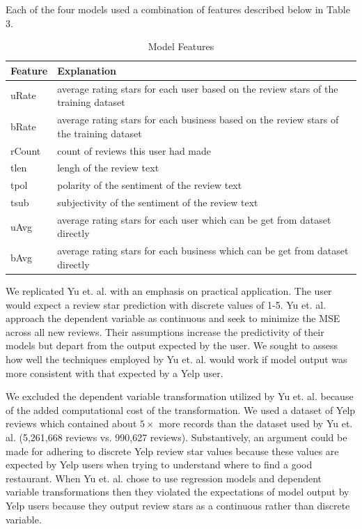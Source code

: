 \documentclass[12pt]{article}
\begin{document}
Each of the four models used a combination of features described below in Table 3.

\begin{table}[h]
  \caption{\label{tab:features}Model Features}
  \centering
\begin{tabular}{| l | l |}
  \hline
  \textbf{Feature} & \textbf{Explanation} \\
  \hline
  uRate & average rating stars for each user based on the review stars of the
          training dataset \\
  \hline
  bRate & average rating stars for each business based on the review stars of the training 
          dataset \\
  \hline
  rCount & count of reviews this user had made \\
  \hline
  tlen & lengh of the review text \\
  \hline
  tpol & polarity of the sentiment of the review text \\
  \hline
  tsub & subjectivity of the sentiment of the review text \\
  \hline
  uAvg & average rating stars for each user which can be get from dataset directly \\
  \hline
  bAvg & average rating stars for each business which can be get from dataset directly \\
  \hline
\end{tabular}
\end{table}

We replicated Yu et. al. \cite{yu2015restaurants} with an emphasis on practical application. The
user would expect a review star prediction with discrete values of 1-5. Yu et. al.
\cite{yu2015restaurants} approach the dependent variable as continuous and seek to minimize
the MSE across all new reviews. Their assumptions increase the predictivity of their models but
depart from the output expected by the user. We sought to assess how well the techniques employed
by Yu et. al. would work if model output was more consistent with that expected by a Yelp user.

We excluded the dependent variable transformation utilized by Yu et. al. \cite{yu2015restaurants}
because of the added computational cost of the transformation. We used a dataset of Yelp reviews
which contained about $5 \times$ more records than the dataset used by Yu et. al. \cite{yu2015restaurants} (5,261,668 reviews vs. 990,627 reviews). Substantively, an argument could be made for
adhering to discrete Yelp review star values because these values are expected by Yelp users
when trying to understand where to find a good restaurant. When Yu et. al. \cite{yu2015restaurants}
chose to use regression models and dependent variable transformations then they violated
the expectations of model output by Yelp users because they output review stars as a continuous
rather than discrete variable.
\end{document}
